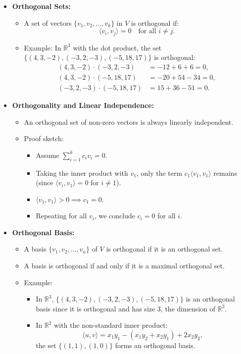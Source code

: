 \documentclass{article}
\begin{document}
\begin{itemize}
  \item \textbf{Orthogonal Sets:}
    \begin{itemize}
      \item A set of vectors $\{v_1, v_2, \dots, v_k\}$ in $V$ is orthogonal if:
        \[
          \langle v_i, v_j \rangle = 0 \quad \text{for all } i \neq j.
        \]
      \item Example: In $\mathbb{R}^3$ with the dot product, the set $\{(4, 3, -2), (-3, 2, -3), (-5, 18, 17)\}$ is orthogonal:
        \begin{align*}
          (4, 3, -2) \cdot (-3, 2, -3) &= -12 + 6 + 6 = 0, \\
          (4, 3, -2) \cdot (-5, 18, 17) &= -20 + 54 - 34 = 0, \\
          (-3, 2, -3) \cdot (-5, 18, 17) &= 15 + 36 - 51 = 0.
        \end{align*}
    \end{itemize}

  \item \textbf{Orthogonality and Linear Independence:}
    \begin{itemize}
      \item An orthogonal set of non-zero vectors is always linearly independent.
      \item Proof sketch:
        \begin{itemize}
          \item Assume $\sum_{i=1}^k c_i v_i = 0$.
          \item Taking the inner product with $v_1$, only the term $c_1 \langle v_1, v_1 \rangle$ remains (since $\langle v_i, v_1 \rangle = 0$ for $i \neq 1$).
          \item $\langle v_1, v_1 \rangle > 0 \implies c_1 = 0$.
          \item Repeating for all $v_i$, we conclude $c_i = 0$ for all $i$.
        \end{itemize}
    \end{itemize}

  \item \textbf{Orthogonal Basis:}
    \begin{itemize}
      \item A basis $\{v_1, v_2, \dots, v_n\}$ of $V$ is orthogonal if it is an orthogonal set.
      \item A basis is orthogonal if and only if it is a maximal orthogonal set.
      \item Example:
        \begin{itemize}
          \item In $\mathbb{R}^3$, $\{(4, 3, -2), (-3, 2, -3), (-5, 18, 17)\}$ is an orthogonal basis since it is orthogonal and has size 3, the dimension of $\mathbb{R}^3$.
          \item In $\mathbb{R}^2$ with the non-standard inner product:
            \[
              \langle u, v \rangle = x_1 y_1 - (x_1 y_2 + x_2 y_1) + 2x_2 y_2,
            \]
            the set $\{(1, 1), (1, 0)\}$ forms an orthogonal basis.
        \end{itemize}
    \end{itemize}
\end{itemize}
\end{document}
